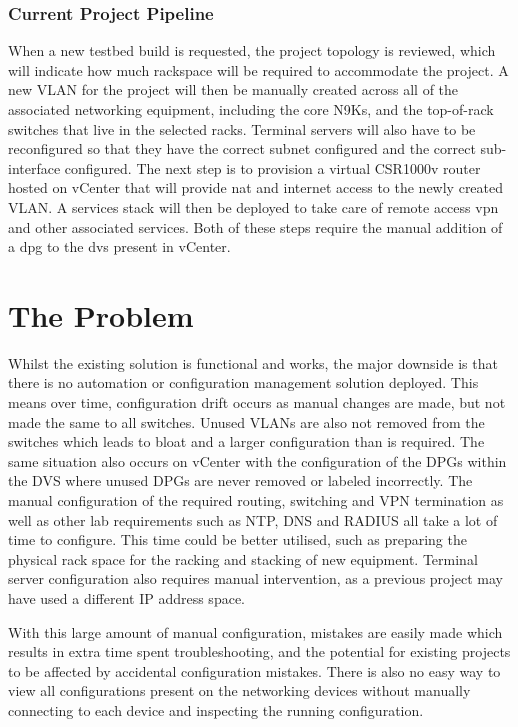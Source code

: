 \subsubsection{Current Project Pipeline}
When a new testbed build is requested, the project topology is reviewed, which will indicate how much rackspace will be required to accommodate the project. A new VLAN for the project will then be manually created across all of the associated networking equipment, including the core N9Ks, and the top-of-rack switches that live in the selected racks. Terminal servers will also have to be reconfigured so that they have the correct subnet configured and the correct sub-interface configured. The next step is to provision a virtual CSR1000v router hosted on vCenter that will provide \gls{nat} and internet access to the newly created VLAN. A services stack will then be deployed to take care of remote access \gls{vpn} and other associated services. Both of these steps require the manual addition of a \gls{dpg} to the \gls{dvs} present in vCenter.
\section{The Problem}
\label{intro:problem}

Whilst the existing
solution is functional and works, the major downside is that there is no
automation or configuration management solution deployed. This means over time,
configuration drift occurs as manual changes are made, but not made the same to
all switches. Unused VLANs are also not removed from the switches which leads
to bloat and a larger configuration than is required. The same situation also
occurs on vCenter with the configuration of the DPGs within the DVS where
unused DPGs are never removed or labeled incorrectly.\newline
The manual configuration of the required routing, switching and VPN termination as well as
other lab requirements such as NTP, DNS and RADIUS all take a lot of time to
configure. This time could be better utilised, such as preparing the physical
rack space for the racking and stacking of new equipment. Terminal server configuration also requires manual intervention, as a previous project may have used a different IP address space.

With this large amount of manual configuration, mistakes are easily made which results in extra time spent troubleshooting, and the potential for existing projects to be affected by accidental configuration mistakes. There is also no easy way to view all configurations present on the networking devices without manually connecting to each device and inspecting the running configuration.
